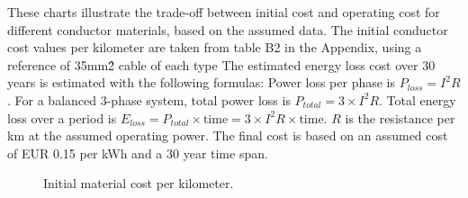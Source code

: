 \documentclass[12pt, a4paper]{article}
\begin{document}
These charts illustrate the trade-off between initial cost and operating cost for different conductor materials, based on the assumed data.
The initial conductor cost values per kilometer are taken from table B2 in the Appendix, using a reference of 35mm\^2 cable of each type
The estimated energy loss cost over 30 years is estimated with the following formulas: Power loss per phase is $P_{loss} = I^2 R$. For a balanced 3-phase system, total power loss is $P_{total} = 3 \times I^2 R$. Total energy loss over a period is $E_{loss} = P_{total} \times \text{time} = 3 \times I^2 R \times \text{time}$. $R$ is the resistance per km at the assumed operating power. The final cost is based on an assumed cost of EUR 0.15 per kWh and a 30 year time span.

\begin{figure}[h!]
\centering
\caption{Initial material cost per kilometer.}
\end{figure}
\end{document}
